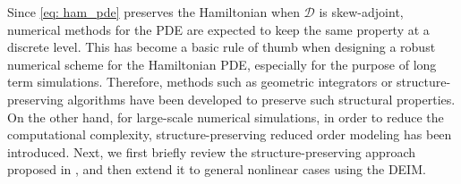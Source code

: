 \documentclass[11pt]{article}
\begin{document}
Since \eqref{eq: ham_pde} preserves the Hamiltonian when $\mathcal{D}$ is skew-adjoint, numerical methods for the PDE are expected to keep the same property at a discrete level. This has become a basic rule of thumb when designing a robust numerical scheme for the Hamiltonian PDE, especially for the purpose of long term simulations. Therefore, methods such as geometric integrators \cite{Hairer02,Feng03,Bridges06,Wang2013} or structure-preserving algorithms \cite{Quispel08,Hairer10,Cohen11,Celledoni2012,Dahlby2011,Gong2014} have been developed to preserve such structural properties. 
On the other hand, for large-scale numerical simulations, in order to reduce the computational complexity, structure-preserving reduced order modeling has been introduced. 
Next, we first briefly review the structure-preserving approach proposed in \cite{gong2017structure}, and then extend it to general nonlinear cases using the DEIM.
\end{document}
